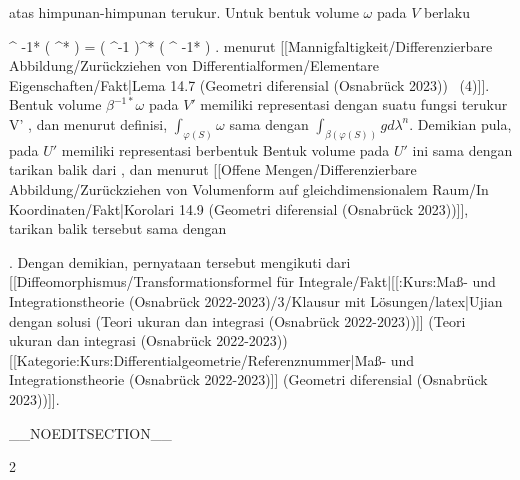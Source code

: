 {atas himpunan-himpunan terukur. Untuk bentuk volume $\omega$ pada $V$ berlaku

\mavergleichskettedisp
{\vergleichskette
{ \alpha^{ {-1}*} ( \varphi^* \omega)
}
{ =} { \left(  \beta \circ \varphi \circ \alpha^{-1}  \right)^*  ( \beta^{ {-1}*} \omega)
}
{ } {
}
{ } {
}
{ } {
}
}
{}{}{.}
menurut
[[Mannigfaltigkeit/Differenzierbare Abbildung/Zurückziehen von Differentialformen/Elementare Eigenschaften/Fakt|Lema 14.7 (Geometri diferensial (Osnabrück 2023))  (4)]].
Bentuk volume $\beta^{ {-1}*} \omega$ pada $V'$ memiliki representasi
 dengan suatu fungsi terukur
 {V'} {\R
} {},
dan menurut definisi, $\int_{\varphi(S)} \omega$ sama dengan $\int_{\beta( \varphi(S))} g d \lambda^n$. Demikian pula,
 pada $U'$ memiliki representasi berbentuk
 Bentuk volume pada $U'$ ini sama dengan tarikan balik dari
, dan menurut
[[Offene Mengen/Differenzierbare Abbildung/Zurückziehen von Volumenform auf gleichdimensionalem Raum/In Koordinaten/Fakt|Korolari 14.9 (Geometri diferensial (Osnabrück 2023))]],
tarikan balik tersebut sama dengan

 {  }

 {} {.}
Dengan demikian, pernyataan tersebut mengikuti dari
[[Diffeomorphismus/Transformationsformel für Integrale/Fakt|[[:Kurs:Maß- und Integrationstheorie (Osnabrück 2022-2023)/3/Klausur mit Lösungen/latex|Ujian dengan solusi (Teori ukuran dan integrasi (Osnabrück 2022-2023))]] (Teori ukuran dan integrasi (Osnabrück 2022-2023))[[Kategorie:Kurs:Differentialgeometrie/Referenznummer|Maß- und Integrationstheorie (Osnabrück 2022-2023)]] (Geometri diferensial (Osnabrück 2023))]].

 }

__NOEDITSECTION__

{2}

